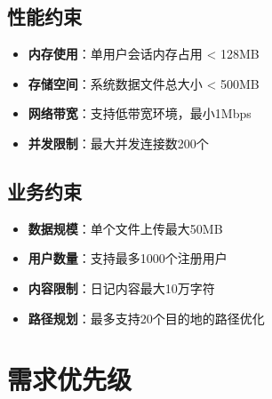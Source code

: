 \documentclass[12pt,a4paper]{article}
\begin{document}
\subsection{性能约束}

\begin{itemize}
    \item \textbf{内存使用}：单用户会话内存占用 < 128MB
    \item \textbf{存储空间}：系统数据文件总大小 < 500MB
    \item \textbf{网络带宽}：支持低带宽环境，最小1Mbps
    \item \textbf{并发限制}：最大并发连接数200个
\end{itemize}

\subsection{业务约束}

\begin{itemize}
    \item \textbf{数据规模}：单个文件上传最大50MB
    \item \textbf{用户数量}：支持最多1000个注册用户
    \item \textbf{内容限制}：日记内容最大10万字符
    \item \textbf{路径规划}：最多支持20个目的地的路径优化
\end{itemize}

\section{需求优先级}
\end{document}
